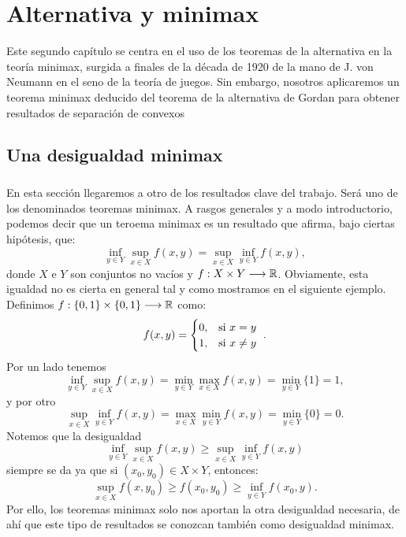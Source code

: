\chapter{Alternativa y minimax}
\newcommand{\topSpace}{X}
\newcommand{\topSpaceY}{Y}
Este segundo capítulo se centra en el uso de los teoremas de la alternativa en la teoría minimax, surgida a finales de la década de 1920 de la mano de J. von Neumann en el seno de la teoría de juegos. Sin embargo, nosotros aplicaremos un teorema minimax deducido del teorema de la alternativa de Gordan para obtener resultados de separación de convexos
\section{Una desigualdad minimax}
\paragraph{}En esta sección llegaremos a otro de los resultados clave del trabajo. Será uno de los denominados teoremas minimax. A rasgos generales y a modo introductorio, podemos decir que un teroema minimax es un resultado que afirma, bajo ciertas hipótesis, que:
\[
\inf_{y \in Y} \sup_{x \in X} f(x,y) = \sup_{x \in X} \inf_{y \in Y} f(x,y),
\] 
donde $ X \text{ e } Y$ son conjuntos no vacíos y $ f: X \times Y \longrightarrow \mathbb{R} $. Obviamente, esta igualdad no es cierta en general tal y como mostramos en el siguiente ejemplo. Definimos $ f:\{0,1\} \times \{0,1\} \longrightarrow \mathbb{R}$ como:
\[
f(x,y) = \begin{cases}
0, & \mbox{si $ x=y $ } \\
1, & \mbox{si $ x\neq y$ }
\end{cases}.
\]
Por un lado tenemos
\[
\inf_{ y \in Y}\sup_{x \in X} f(x,y) = \min_{ y \in Y}\max_{x \in X} f(x,y) = \min_{ y \in Y}\{1\} = 1,
\]
y por otro
\[
\sup_{x \in X} \inf_{ y \in Y}f(x,y) = \max_{x \in X}\min_{ y \in Y}f(x,y) = \min_{ y \in Y}\{0\} = 0.
\]
Notemos que la desigualdad 
\[
\inf_{y \in Y} \sup_{x \in X} f(x,y) \geq \sup_{x \in X} \inf_{y \in Y} f(x,y)
\] 
siempre se da ya que si $ (x_0, y_0) \in X \times Y $, entonces:
\[
\sup_{x \in X} f(x,y_0) \geq f(x_0,y_0) \geq \inf_{y \in Y}f(x_0,y) .
\]
Por ello, los teoremas minimax solo nos aportan la otra desigualdad necesaria, de ahí que este tipo de resultados se conozcan también como desigualdad minimax. \\

